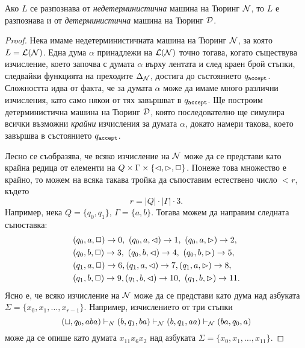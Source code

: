 \begin{important}
  \begin{theorem}
    Ако $L$ се разпознава от {\em недетерминистична} машина на Тюринг $\mathcal{N}$, то $L$
    е разпознава и от {\em детерминистична} машина на Тюринг $\mathcal{D}$.
  \end{theorem}
\end{important}
\begin{proof}
  Нека имаме недетерминистичната машина на Тюринг $\mathcal{N}$, за която $L = \mathcal{L}(\mathcal{N})$.
  Една дума $\alpha$ принадлежи на $\mathcal{L}(\mathcal{N})$ точно тогава, когато съществува изчисление,
  което започва с думата $\alpha$ върху лентата и след краен брой стъпки, следвайки функцията на преходите $\Delta_{\mathcal{N}}$,
  достига до състоянието $q_{\texttt{accept}}$.
  Сложността идва от факта, че за думата $\alpha$ може да имаме много различни изчисления, 
  като само някои от тях завършват в $q_{\texttt{accept}}$. Ще построим детерминистична машина на Тюринг $\mathcal{D}$,
  която последователно ще симулира всички възможни {\em крайни} изчисления за думата $\alpha$, докато 
  намери такова, което завършва в състоянието $q_{\texttt{accept}}$.
  
  Лесно се съобразява, че всяко изчисление на $\mathcal{N}$ може да се представи като 
  крайна редица от елементи на $Q \times \Gamma \times \{\lhd,\rhd,\Box\}$.
  Понеже това множество е крайно, то можем на всяка такава тройка да
  съпоставим естествено число $ < r$, където 
  \[r = |Q| \cdot |\Gamma| \cdot 3.\]
  Например, нека $Q = \{q_0,q_1\}$, $\Gamma = \{a,b\}$. Тогава можем да направим следната съпоставка:
  \begin{align*}
    & (q_0,a,\stay) \to 0,\ (q_0,a,\goleft) \to 1,\ (q_0,a,\goright) \to 2,\\
    & (q_0,b,\stay) \to 3,\ (q_0,b,\goleft) \to 4, \ (q_0,b,\goright) \to 5,\\
    & (q_1,a,\stay) \to 6, (q_1,a,\goleft) \to 7, (q_1,a,\goright) \to 8,\\
    & (q_1,b,\stay) \to 9, (q_1,b,\goleft) \to 10,\ (q_1,b,\goright) \to 11.
  \end{align*}
  Ясно е, че всяко изчисление на $\mathcal{N}$ може да се представи като дума над азбуката $\Sigma = \{x_0,x_1,\dots,x_{r-1}\}$.
  Например, изчислението от три стъпки
  \[(\sqcup,q_0,aba) \vdash_N (b,q_1,ba) \vdash_{\mathcal{N}} (b,q_1,aa) \vdash_{\mathcal{N}} (ba,q_0,a)\]
  може да се опише като думата $x_{11}x_6x_2$ над азбуката $\Sigma = \{x_0,x_1,\dots,x_{11}\}$.
  

\end{proof}
